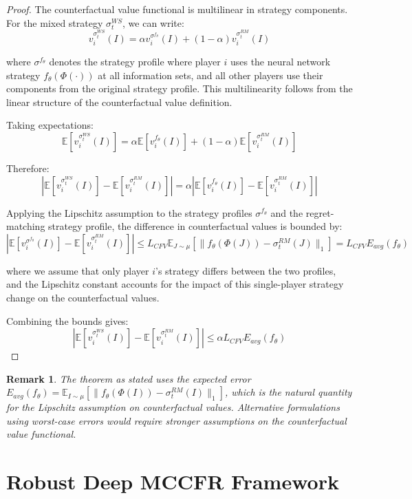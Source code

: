 \documentclass[12pt,a4paper]{article}
\newtheorem{remark}[theorem]{Remark}
\begin{document}
\begin{proof}
The counterfactual value functional is multilinear in strategy components. For the mixed strategy $\sigma_t^{WS}$, we can write:
$$v_i^{\sigma_t^{WS}}(I) = \alpha v_i^{\sigma^{f_\theta}}(I) + (1-\alpha) v_i^{\sigma_t^{RM}}(I)$$

where $\sigma^{f_\theta}$ denotes the strategy profile where player $i$ uses the neural network strategy $f_\theta(\Phi(\cdot))$ at all information sets, and all other players use their components from the original strategy profile. This multilinearity follows from the linear structure of the counterfactual value definition.

Taking expectations:
$$\mathbb{E}[v_i^{\sigma_t^{WS}}(I)] = \alpha \mathbb{E}[v_i^{f_\theta}(I)] + (1-\alpha) \mathbb{E}[v_i^{\sigma_t^{RM}}(I)]$$

Therefore:
$$|\mathbb{E}[v_i^{\sigma_t^{WS}}(I)] - \mathbb{E}[v_i^{\sigma_t^{RM}}(I)]| = \alpha |\mathbb{E}[v_i^{f_\theta}(I)] - \mathbb{E}[v_i^{\sigma_t^{RM}}(I)]|$$

Applying the Lipschitz assumption to the strategy profiles $\sigma^{f_\theta}$ and the regret-matching strategy profile, the difference in counterfactual values is bounded by:
$$|\mathbb{E}[v_i^{\sigma^{f_\theta}}(I)] - \mathbb{E}[v_i^{\sigma_t^{RM}}(I)]| \leq L_{CFV} \mathbb{E}_{J \sim \mu}[\|f_\theta(\Phi(J)) - \sigma_t^{RM}(J)\|_1] = L_{CFV} E_{avg}(f_\theta)$$

where we assume that only player $i$'s strategy differs between the two profiles, and the Lipschitz constant accounts for the impact of this single-player strategy change on the counterfactual values.

Combining the bounds gives:
$$|\mathbb{E}[v_i^{\sigma_t^{WS}}(I)] - \mathbb{E}[v_i^{\sigma_t^{RM}}(I)]| \leq \alpha L_{CFV} E_{avg}(f_\theta)$$
\end{proof}

\begin{remark}
The theorem as stated uses the expected error $E_{avg}(f_\theta) = \mathbb{E}_{I \sim \mu}[\|f_\theta(\Phi(I)) - \sigma_t^{RM}(I)\|_1]$, which is the natural quantity for the Lipschitz assumption on counterfactual values. Alternative formulations using worst-case errors would require stronger assumptions on the counterfactual value functional.
\end{remark}

\section{Robust Deep MCCFR Framework}
\label{sec:method}
\end{document}
